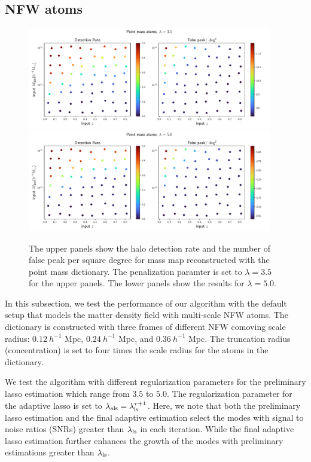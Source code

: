 \documentclass[twocolumn]{aastex62}
\begin{document}
\subsection{NFW atoms}
\label{subsec:test-nfw}

\begin{figure}[!ht]
 \centering
 \includegraphics[width=0.95\textwidth]{detfalseRate_f1-1.pdf}
 \includegraphics[width=0.95\textwidth]{detfalseRate_f1-3.pdf}
 \caption{The upper panels show the halo detection rate and the number of false
     peak per square degree for mass map reconstructed with the point mass
     dictionary. The penalization paramter is set to $\lambda=3.5$ for the
     upper panels.  The lower panels show the results for $\lambda=5.0$.
        }\label{fig-detFalsRatePM}
\end{figure}

In this subsection, we test the performance of our algorithm with the default
setup that models the matter density field with multi-scale NFW atoms. The
dictionary is constructed with three frames of different NFW comoving scale
radius: $0.12~h^{-1}$ Mpc, $0.24~h^{-1}$ Mpc, and $0.36~h^{-1}$ Mpc.  The
truncation radius (concentration) is set to four times the scale radius for the
atoms in the dictionary.

We test the algorithm with different regularization parameters for the
preliminary lasso estimation which range from $3.5$ to $5.0$. The
regularization parameter for the adaptive lasso is set to
$\lambda_{\rm{als}}=\lambda_{\rm{ls}}^{\tau+1}$.
Here, we note that both the preliminary lasso estimation and the final adaptive
estimation select the modes with signal to noise ratios (SNRs) greater than
$\lambda_{\rm{ls}}$ in each iteration. While the final adaptive lasso
estimation further enhances the growth of the modes with preliminary
estimations greater than $\lambda_{\rm{ls}}$.
\end{document}
